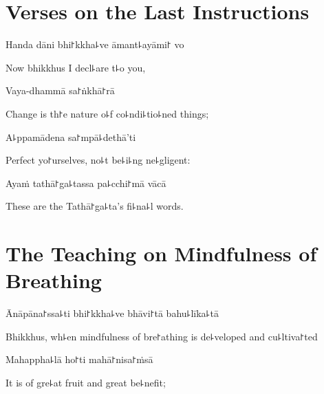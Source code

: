 \chapter{Verses on the Last Instructions}%


\begin{leader}
\end{leader}

Handa dāni bhi꜓kkha꜕ve āmant꜕ayāmi꜓ vo

\begin{english}
  Now bhikkhus I decl꜕are t꜕o you,
\end{english}

Vaya-dhammā sa꜓ṅkhā꜓rā

\begin{english}
  Change is th꜓e nature o꜕f co꜕ndi꜕tio꜕ned things;
\end{english}

A꜕ppamādena sa꜓mpā꜕dethā'ti

\begin{english}
  Perfect yo꜓urselves, no꜕t be꜕i꜕ng ne꜕gligent:
\end{english}

Ayaṁ tathā꜓ga꜕tassa pa꜕cchi꜓mā vācā

\begin{english}
  These are the Tathā꜓ga꜕ta's fi꜕na꜕l words.
\end{english}

\chapter{The Teaching on Mindfulness of Breathing}%


\begin{leader}
\end{leader}

Ānāpāna꜓ssa꜕ti bhi꜓kkha꜕ve bhāvi꜓tā bahu꜕līka꜕tā

\begin{english}
  Bhikkhus, wh꜕en mindfulness of bre꜓athing is de꜕veloped and cu꜕ltiva꜓ted
\end{english}

Mahappha꜕lā ho꜓ti mahā꜓nisa꜓ṁsā

\begin{english}
  It is of gre꜕at fruit and great be꜕nefit;
\end{english}

